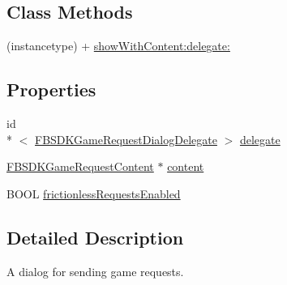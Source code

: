 \subsection*{Class Methods}
\begin{DoxyCompactItemize}
\item 
(instancetype) + \hyperlink{interface_f_b_s_d_k_game_request_dialog_ae9560be075b2e36fcb134eda472e466a}{show\-With\-Content\-:delegate\-:}
\end{DoxyCompactItemize}
\subsection*{Properties}
\begin{DoxyCompactItemize}
\item 
id\\*
$<$ \hyperlink{protocol_f_b_s_d_k_game_request_dialog_delegate-p}{F\-B\-S\-D\-K\-Game\-Request\-Dialog\-Delegate} $>$ \hyperlink{interface_f_b_s_d_k_game_request_dialog_ac33aec2227f6156213a0f8a734d040b2}{delegate}
\item 
\hyperlink{interface_f_b_s_d_k_game_request_content}{F\-B\-S\-D\-K\-Game\-Request\-Content} $\ast$ \hyperlink{interface_f_b_s_d_k_game_request_dialog_a604de6e2ac12fb1e5fb60f5546db09d0}{content}
\item 
B\-O\-O\-L \hyperlink{interface_f_b_s_d_k_game_request_dialog_a4bb722ee3374be16b2eb9a544f40ca9f}{frictionless\-Requests\-Enabled}
\end{DoxyCompactItemize}


\subsection{Detailed Description}
A dialog for sending game requests. 

